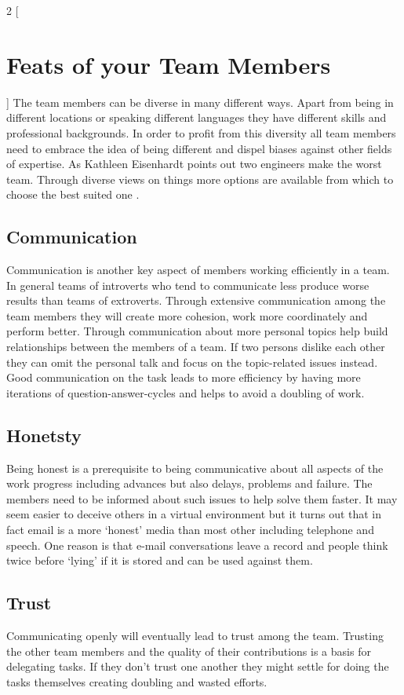 \begin{multicols}{2}
[\section{Feats of your Team Members}]
The team members can be diverse in many different ways. Apart from being in different locations or speaking different languages they have different skills and professional backgrounds. In order to profit from this diversity all team members need to embrace the idea of being different and dispel biases against other fields of expertise. As Kathleen Eisenhardt points out two engineers make the worst team. Through diverse views on things more options are available from which to choose the best suited one \cite{eisenhardt}.

\subsection{Communication}
Communication is another key aspect of members working efficiently in a team. In general teams of introverts who tend to communicate less produce worse results than teams of extroverts. Through extensive communication among the team members they will create more cohesion, work more coordinately and perform better. Through communication about more personal topics help build relationships between the members of a team. If two persons dislike each other they can omit the personal talk and focus on the topic-related issues instead. Good communication on the task leads to more efficiency by having more iterations of question-answer-cycles and helps to avoid a doubling of work\cite{belbin1996management}.

\subsection{Honetsty}
Being honest is a prerequisite to being communicative about all aspects of the work progress including advances but also delays, problems and failure. The members need to be informed about such issues to help solve them faster. It may seem easier to deceive others in a virtual environment but it turns out that in fact email is a more ‘honest’ media than most other including telephone and speech. One reason is that e-mail conversations leave a record and people think twice before ‘lying’ if it is stored and can be used against them\cite{TED}.

\subsection{Trust}
Communicating openly will eventually lead to trust among the team. Trusting the other team members and the quality of their contributions is a basis for delegating tasks. If they don’t trust one another they might settle for doing the tasks themselves creating doubling and wasted efforts.


\end{multicols}
